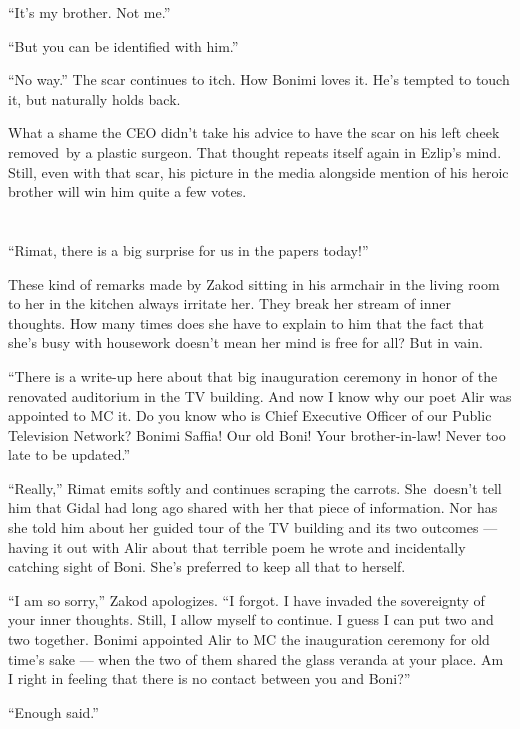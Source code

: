 \documentclass[twoside,11pt]{book}
\begin{document}
``It's my brother. Not me.''

``But you can be identified with him.''

``No way.'' The scar continues to itch. How Bonimi loves it. He's tempted to touch it, but
naturally holds back.

What a shame the CEO didn't take his advice to have the scar on his left cheek
removed~by a plastic surgeon. That
thought repeats itself again in Ezlip's mind. Still, even with that scar, his picture in the media alongside mention of
his heroic brother will win him quite a few votes.



\chapter{}

``Rimat, there is a big surprise for us in the papers today!''

These kind of remarks made by Zakod sitting in his armchair in the living room to her in the kitchen always irritate
her. They break her stream of inner thoughts. { }How many times does
she have to explain{ }to him that the fact that she's busy with housework
doesn't mean her mind is free for all? But in vain.

``There is a write-up here about that big inauguration ceremony in honor of the renovated auditorium in the
TV building. And now I know why our poet Alir was appointed to MC it. Do you know who is Chief Executive Officer of
our Public Television Network? Bonimi Saffia! Our old Boni! Your brother-in-law! Never too late to be
updated.''

``Really,'' Rimat emits softly and continues scraping the carrots. She~doesn't tell him that
Gidal had long ago shared with her that piece of information. Nor has she told him about her guided tour of the TV
building and its two outcomes --- having it out with Alir about that terrible poem he wrote and incidentally catching
sight of Boni. She's preferred to keep all that to herself.

``I am so sorry,'' Zakod apologizes. ``I forgot. I have invaded the sovereignty
of your inner thoughts. Still, I allow myself to continue. I guess I can put two and two together. Bonimi appointed
Alir to MC the inauguration ceremony for old time{'s} sake --- when the two of them shared the glass veranda at your
place. Am I right in feeling that there is no contact between you and Boni?''

``Enough said.''
\end{document}
